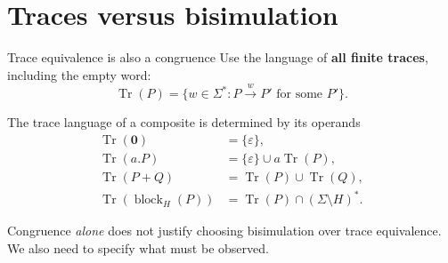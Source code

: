 \documentclass[handout,aspectratio=169,11pt]{beamer}
\newcommand{\step}[1]{\xrightarrow{#1}}
\newcommand{\nil}{\mathbf 0}
\newcommand{\blockact}[2]{\operatorname{block}_{#1}(#2)}
\newcommand{\Tr}{\operatorname{Tr}}
\newcommand{\Takeaway}[1]{\begin{exampleblock}{}#1\end{exampleblock}}
\begin{document}
\section{Traces versus bisimulation}
\begin{frame}{Trace equivalence is also a congruence}
  Use the language of \textbf{all finite traces}, including the empty word:
  \[
    \Tr(P)=\{w\in\Sigma^*: P\step{w}P'\text{ for some }P'\}.
  \]
  \begin{block}{The trace language of a composite is determined by its operands}
    \[
    \begin{aligned}
      \Tr(\nil)&=\{\varepsilon\},\\
      \Tr(a.P)&=\{\varepsilon\}\cup a\Tr(P),\\
      \Tr(P+Q)&=\Tr(P)\cup\Tr(Q),\\
      \Tr(\blockact{H}{P})&=\Tr(P)\cap(\Sigma\setminus H)^*.
    \end{aligned}
    \]
  \end{block}
  \Takeaway{Congruence \emph{alone} does not justify choosing bisimulation over trace equivalence. We also need to specify what must be observed.}
\end{frame}
\end{document}
